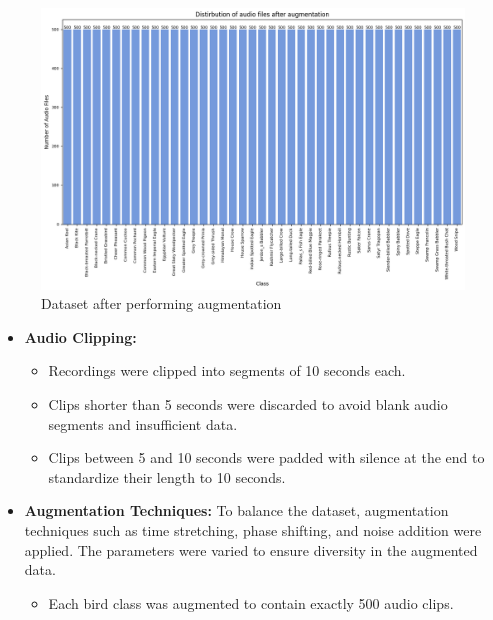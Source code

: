         \begin{figure}[h!]
            \centering
            \includegraphics[width=1\textwidth]{images/after_augmentation.png}
            \caption{Dataset after performing augmentation}
            \label{fig:visualization}
        \end{figure}
        \begin{itemize}
            \item \textbf{Audio Clipping:}
                \begin{itemize}
                    \item Recordings were clipped into segments of 10 seconds each.
                    \item Clips shorter than 5 seconds were discarded to avoid blank audio segments and
                            insufficient data.
                    \item Clips between 5 and 10 seconds were padded with silence at the end to
                            standardize their length to 10 seconds.
                \end{itemize}
        
            \item \textbf{Augmentation Techniques:}
                To balance the dataset, augmentation techniques such as time stretching, phase shifting, and noise addition were applied. The parameters were varied to ensure diversity in the augmented data.
                \begin{itemize}
                    \item Each bird class was augmented to contain exactly 500 audio clips.
                \end{itemize}
        \end{itemize}
        
